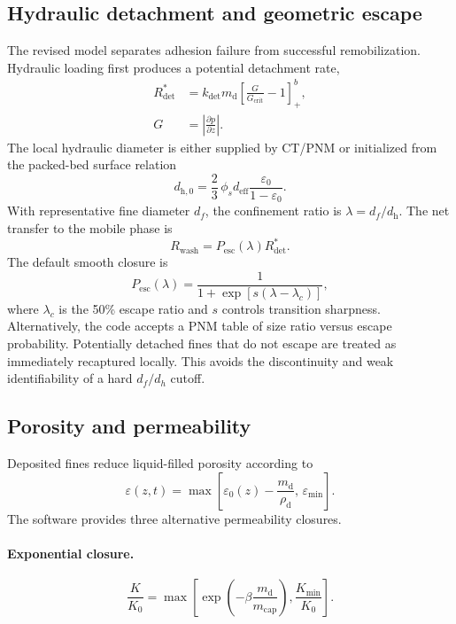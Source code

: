 \documentclass[11pt,a4paper]{article}
\newcommand{\pos}[1]{\left[#1\right]_+}
\begin{document}
\subsection{Hydraulic detachment and geometric escape}

The revised model separates adhesion failure from successful remobilization.
Hydraulic loading first produces a potential detachment rate,
\begin{align}
R_{\mathrm{det}}^*&=k_{\mathrm{det}}m_{\mathrm d}
\pos{\frac{G}{G_{\mathrm{crit}}}-1}^{b},\\
G&=\left|\frac{\partial p}{\partial z}\right|.
\end{align}
The local hydraulic diameter is either supplied by CT/PNM or initialized from
the packed-bed surface relation
\begin{equation}
d_{\mathrm h,0}=\frac{2}{3}\,\phi_s d_{\mathrm{eff}}
\frac{\varepsilon_0}{1-\varepsilon_0}.
\end{equation}
With representative fine diameter $d_f$, the confinement ratio is
$\lambda=d_f/d_{\mathrm h}$. The net transfer to the mobile phase is
\begin{equation}
R_{\mathrm{wash}}=P_{\mathrm{esc}}(\lambda)R_{\mathrm{det}}^*.
\label{eq:washout}
\end{equation}
The default smooth closure is
\begin{equation}
P_{\mathrm{esc}}(\lambda)=
\frac{1}{1+\exp[s(\lambda-\lambda_c)]},
\end{equation}
where $\lambda_c$ is the 50\% escape ratio and $s$ controls transition
sharpness. Alternatively, the code accepts a PNM table of size ratio versus
escape probability. Potentially detached fines that do not escape are treated
as immediately recaptured locally. This avoids the discontinuity and weak
identifiability of a hard $d_f/d_h$ cutoff.

\subsection{Porosity and permeability}

Deposited fines reduce liquid-filled porosity according to
\begin{equation}
\varepsilon(z,t)=\max\!\left[\varepsilon_0(z)
-\frac{m_{\mathrm d}}{\rho_{\mathrm d}},\,\varepsilon_{\min}\right].
\end{equation}
The software provides three alternative permeability closures.

\paragraph{Exponential closure.}
\begin{equation}
\frac{K}{K_0}=\max\!\left[
\exp\!\left(-\beta\frac{m_{\mathrm d}}{m_{\mathrm{cap}}}\right),
\frac{K_{\min}}{K_0}\right]. \label{eq:kexp}
\end{equation}
\end{document}
